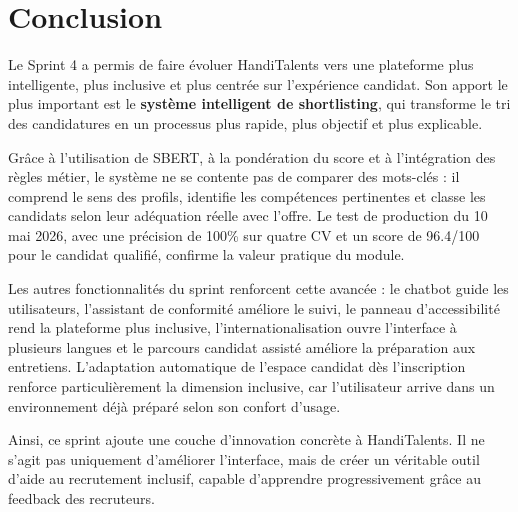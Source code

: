 \documentclass[12pt,a4paper]{report}
\begin{document}
\section{Conclusion}

Le Sprint 4 a permis de faire évoluer HandiTalents vers une plateforme plus intelligente, plus inclusive et plus centrée sur l'expérience candidat. Son apport le plus important est le \textbf{système intelligent de shortlisting}, qui transforme le tri des candidatures en un processus plus rapide, plus objectif et plus explicable.

Grâce à l'utilisation de SBERT, à la pondération du score et à l'intégration des règles métier, le système ne se contente pas de comparer des mots-clés : il comprend le sens des profils, identifie les compétences pertinentes et classe les candidats selon leur adéquation réelle avec l'offre. Le test de production du 10 mai 2026, avec une précision de 100\% sur quatre CV et un score de 96.4/100 pour le candidat qualifié, confirme la valeur pratique du module.

Les autres fonctionnalités du sprint renforcent cette avancée : le chatbot guide les utilisateurs, l'assistant de conformité améliore le suivi, le panneau d'accessibilité rend la plateforme plus inclusive, l'internationalisation ouvre l'interface à plusieurs langues et le parcours candidat assisté améliore la préparation aux entretiens. L'adaptation automatique de l'espace candidat dès l'inscription renforce particulièrement la dimension inclusive, car l'utilisateur arrive dans un environnement déjà préparé selon son confort d'usage.

Ainsi, ce sprint ajoute une couche d'innovation concrète à HandiTalents. Il ne s'agit pas uniquement d'améliorer l'interface, mais de créer un véritable outil d'aide au recrutement inclusif, capable d'apprendre progressivement grâce au feedback des recruteurs.
\end{document}
